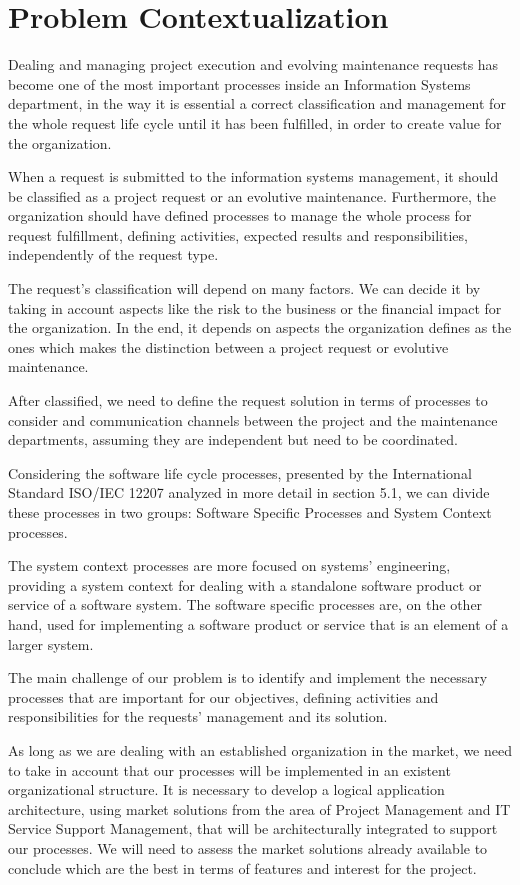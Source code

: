 
% 
% 

\section{Problem Contextualization}


Dealing and managing project execution and evolving maintenance requests has become one of the most important processes inside an Information Systems department, in the way it is essential a correct classification and management for the whole request life cycle until it has been fulfilled, in order to create value for the organization.\par
When a request is submitted to the information systems management, it should be classified as a project request or an evolutive maintenance. Furthermore, the organization should have defined processes to manage the whole process for request fulfillment, defining activities, expected results and responsibilities, independently of the request type.\par
The request's classification will depend on many factors. We can decide it by taking in account aspects like the risk to the business or the financial impact for the organization. In the end, it depends on aspects the organization defines as the ones which makes the distinction between a project request or evolutive maintenance.\par
After classified, we need to define the request solution in terms of processes to consider and communication channels between the project and the maintenance departments, assuming they are independent but need to be coordinated.\par
Considering the software life cycle processes, presented by the International Standard ISO/IEC 12207\cite{ISO12207} analyzed in more detail in section 5.1, we can divide these processes in two groups: Software Specific Processes and System Context processes.\par
The system context processes are more focused on systems' engineering, providing a system context for dealing with a standalone software product or service of a software system. The software specific processes are, on the other hand, used for implementing a software product or service that is an element of a larger system. \par 
The main challenge of our problem is to identify and implement the necessary processes that are important for our objectives, defining activities and responsibilities for the requests' management and its solution.\par
As long as we are dealing with an established organization in the market, we need to take in account that our processes will be implemented in an existent organizational structure. It is necessary to develop a logical application architecture, using market solutions from the area of Project Management and IT Service Support Management, that will be architecturally integrated to support our processes. We will need to assess the market solutions already available to conclude which are the best in terms of features and interest for the project. 
